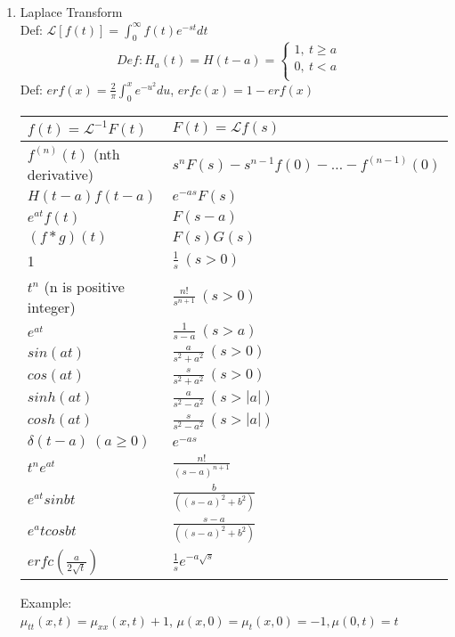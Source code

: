 \documentclass[10pt]{article}
\newcommand{\Lap}{\mathcal{L}}
\begin{document}
\begin{multicols}{2}
\begin{enumerate}
		\item Laplace Transform\\
		Def: $\Lap[f(t)] = \int_{0}^{\infty}f(t)e^{-st}dt$\\
		\begin{equation}
		Def: H_a(t) = H(t-a) = 
		\left\{
		\begin{array}{lr}
			1, \ t \ge a&\\
			0, \ t < a\\
			\end{array}
			\right.
		\end{equation}
		Def: $erf(x) = \frac{2}{\pi} \int_{0}^{x} e^{-u^2}du$, $erfc(x) = 1-erf(x)$
		\begin{center}
			\begin{tabular}{|l l|} \hline
				$f(t) = \Lap^{-1}F (t)$		& $F (t) = \Lap f(s)$ \\ \hline
				$f^{(n)}(t)$ (nth derivative)	& $s^n F(s)-s^{n-1}f(0) - \dots - f^{(n-1)}(0)$  \\
				$H(t-a)f(t-a)$	& $e^{-as}F(s)$ \\
				$e^{at}f(t)$	& $F(s-a)$ \\
				$(f*g)(t)$ 		& $F(s)G(s)$ \\
				1 				& $\frac{1}{s} \ (s > 0)$ \\
				$t^n$ (n is positive integer) & $\frac{n!}{s^{n+1}} \ (s>0) $\\
				$e^{at}$ 			& $ \frac{1}{s-a} \ (s > a)$ \\
				$sin(at)$ 		& $\frac{a}{s^2+a^2} \ (s > 0)$ \\
				$cos(at)$		& $\frac{s}{s^2+a^2} \ (s > 0)$ \\
				$sinh(at)$		& $\frac{a}{s^2-a^2} \ (s > |a|)$ \\
				$cosh(at)$		& $\frac{s}{s^2-a^2} \ (s > |a|)$ \\
				$\delta(t-a) \ (a \ge 0)$ & $e^{-as}$ \\
				$t^ne^{at}$ 	& $\frac{n!}{(s-a)^{n+1}}$ \\
				$e^{at}sinbt$ 	& $\frac{b}{((s-a)^2 + b^2)}$ \\
				$e^atcosbt$		& $\frac{s-a}{((s-a)^2 + b^2)}$ \\
				$erfc(\frac{a}{2 \sqrt{t} })$ & $\frac{1}{s} e^{-a \sqrt{s} }$ \\ \hline
			\end{tabular}
		\end{center}
		Example:\\
		$\mu_{tt}(x,t) = \mu_{xx}(x,t) + 1$, $\mu(x,0) = \mu_t(x,0) = -1, \mu(0,t) = t$\\

\end{enumerate}
\end{multicols}
\end{document}
